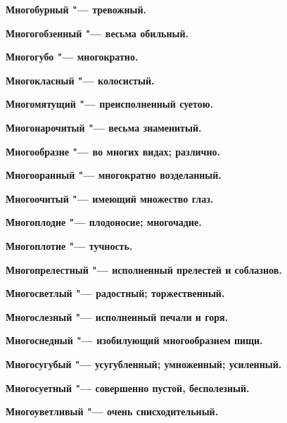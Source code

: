 \bfseries Многобурный \normalfont{} "--- тревожный. 




\bfseries Многогобзенный \normalfont{} "--- весьма обильный. 




\bfseries Многогубо \normalfont{} "--- многократно. 




\bfseries Многокласный \normalfont{} "--- колосистый. 




\bfseries Многомятущий \normalfont{} "--- преисполненный суетою. 




\bfseries Многонарочитый \normalfont{} "--- весьма знаменитый. 




\bfseries Многообразне \normalfont{} "--- во многих видах; различно. 




\bfseries Многооранный \normalfont{} "--- многократно возделанный. 




\bfseries Многоочитый \normalfont{} "--- имеющий множество глаз. 




\bfseries Многоплодие \normalfont{} "--- плодоносие; многочадие. 




\bfseries Многоплотие \normalfont{} "--- тучность. 




\bfseries Многопрелестный \normalfont{} "--- исполненный прелестей и соблазнов. 




\bfseries Многосветлый \normalfont{} "--- радостный; торжественный. 




\bfseries Многослезный \normalfont{} "--- исполненный печали и горя. 




\bfseries Многоснедный \normalfont{} "--- изобилующий многообразием пищи. 




\bfseries Многосугубый \normalfont{} "--- усугубленный; умноженный; усиленный. 




\bfseries Многосуетный \normalfont{} "--- совершенно пустой, бесполезный. 




\bfseries Многоуветливый \normalfont{} "--- очень снисходительный. 




